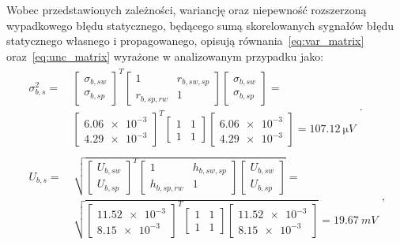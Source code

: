 Wobec przedstawionych zależności, wariancję oraz niepewność rozszerzoną wypadkowego błędu statycznego, będącego sumą skorelowanych sygnałów błędu statycznego własnego i propagowanego, opisują równania~\eqref{eq:var_matrix} oraz~\eqref{eq:unc_matrix} wyrażone w analizowanym przypadku jako:
\begin{gather}
\begin{split}
\sigma_{b,s}^{2} = ~ &
\begin{bmatrix}
\sigma_{b,sw} \\ \sigma_{b,sp}
\end{bmatrix}^{T}
\begin{bmatrix}
1 & r_{b,sw,sp} \\
r_{b,sp,rw} & 1
\end{bmatrix}
\begin{bmatrix}
\sigma_{b,sw} \\ \sigma_{b,sp}
\end{bmatrix} = \\ &
\begin{bmatrix}
\num{6.06e-3} \\ \num{4.29e-3}
\end{bmatrix}^{T}
\begin{bmatrix}
1 & 1 \\
1 & 1
\end{bmatrix}
\begin{bmatrix}
\num{6.06e-3} \\ \num{4.29e-3}
\end{bmatrix} = \qty{107.12}{\micro V}
\end{split}
\label{eq:sym_partb_stat_var}. \\
\begin{split}
U_{b,s} = ~ & \sqrt{
\begin{bmatrix}
U_{b,sw} \\ U_{b,sp}
\end{bmatrix}^{T}
\begin{bmatrix}
1 & h_{b,sw,sp} \\
h_{b,sp,rw} & 1
\end{bmatrix}
\begin{bmatrix}
U_{b,sw} \\ U_{b,sp}
\end{bmatrix}} = \\ & \sqrt{
\begin{bmatrix}
\num{11.52e-3} \\ \num{8.15e-3}
\end{bmatrix}^{T}
\begin{bmatrix}
1 & 1 \\
1 & 1
\end{bmatrix}
\begin{bmatrix}
\num{11.52e-3} \\ \num{8.15e-3}
\end{bmatrix}} = \qty{19.67}{mV}
\end{split}
\label{eq:sym_partb_stat_uncert},
\end{gather}

